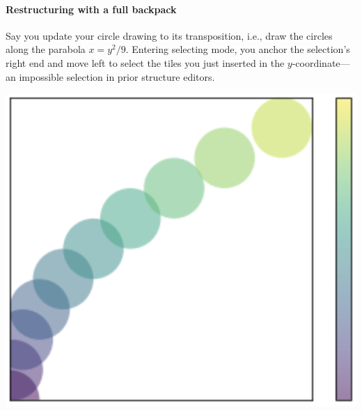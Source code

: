 
\paragraph{Restructuring with a full backpack}
Say you update your circle drawing
to its transposition, i.e., draw the circles along
the parabola $x = y^2/9$.
Entering selecting mode, you anchor the selection's right
end and move left to select the tiles you just
inserted in the $y$-coordinate---an impossible
selection in prior structure editors.

\noindent
\begin{minipage}[t]{0.2\columnwidth}
  \includegraphics[width=\textwidth]{img/circles-parabola-transpose.png}
\end{minipage}
\hfill

